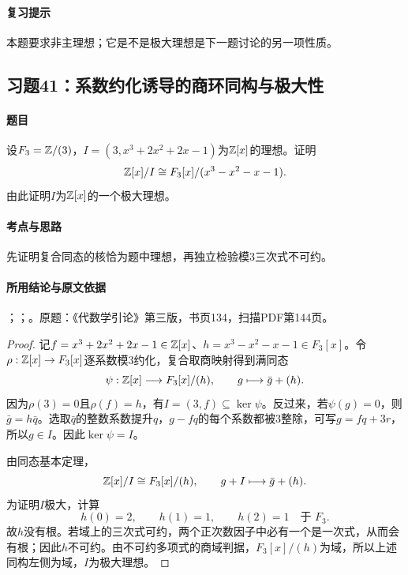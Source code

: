 \paragraph{复习提示}

本题要求非主理想；它是不是极大理想是下一题讨论的另一项性质。



\subsection{习题41：系数约化诱导的商环同构与极大性}

\label{ex:3:41}

\paragraph{题目}

设$F_3=\mathbb Z/(3)$，$I=(3,x^3+2x^2+2x-1)$为$\mathbb Z[x]$的理想。证明
\[
\mathbb Z[x]/I\cong F_3[x]/(x^3-x^2-x-1).
\]
由此证明$I$为$\mathbb Z[x]$的一个极大理想。

\paragraph{考点与思路}

先证明复合同态的核恰为题中理想，再独立检验模3三次式不可约。

\paragraph{所用结论与原文依据}

；；。原题：《代数学引论》第三版，书页134，扫描PDF第144页。


\begin{proof}

记$f=x^3+2x^2+2x-1\in\mathbb Z[x]$、$h=x^3-x^2-x-1\in F_3[x]$。令$\rho:\mathbb Z[x]\to F_3[x]$逐系数模$3$约化，复合取商映射得到满同态
\[
\psi:\mathbb Z[x]\longrightarrow F_3[x]/(h),\qquad
g\longmapsto\bar g+(h).
\]
因为$\rho(3)=0$且$\rho(f)=h$，有$I=(3,f)\subseteq\ker\psi$。反过来，若$\psi(g)=0$，则$\bar g=h\bar q$。选取$\bar q$的整数系数提升$q$，$g-fq$的每个系数都被$3$整除，可写$g=fq+3r$，所以$g\in I$。因此$\ker\psi=I$。

由同态基本定理，
\[
\mathbb Z[x]/I\cong F_3[x]/(h),\qquad
g+I\longmapsto\bar g+(h).
\]
为证明$I$极大，计算
\[
h(0)=2,\qquad h(1)=1,\qquad h(2)=1\quad\text{于 }F_3.
\]
故$h$没有根。若域上的三次式可约，两个正次数因子中必有一个是一次式，从而会有根；因此$h$不可约。由不可约多项式的商域判据，$F_3[x]/(h)$为域，所以上述同构左侧为域，$I$为极大理想。

\end{proof}

